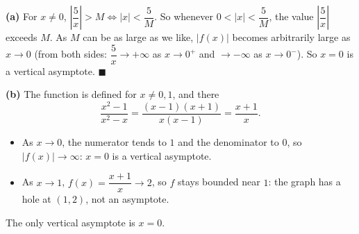\textbf{(a)} For $x\ne0$, $\left|\dfrac5x\right|>M\iff|x|<\dfrac5M$. So whenever $0<|x|<\dfrac5M$, the value $\left|\dfrac5x\right|$ exceeds $M$. As $M$ can be as large as we like, $|f(x)|$ becomes arbitrarily large as $x\to0$ (from both sides: $\dfrac5x\to+\infty$ as $x\to0^+$ and $\to-\infty$ as $x\to0^-$). So $x=0$ is a vertical asymptote. $\blacksquare$

\textbf{(b)} The function is defined for $x\ne0,1$, and there
\[\dfrac{x^2-1}{x^2-x}=\dfrac{(x-1)(x+1)}{x(x-1)}=\dfrac{x+1}{x}.\]
\begin{itemize}
\item As $x\to0$, the numerator tends to $1$ and the denominator to $0$, so $|f(x)|\to\infty$: $x=0$ is a vertical asymptote.
\item As $x\to1$, $f(x)=\dfrac{x+1}{x}\to2$, so $f$ stays bounded near $1$: the graph has a hole at $(1,2)$, not an asymptote.
\end{itemize}
The only vertical asymptote is $\boxed{x=0}$.
